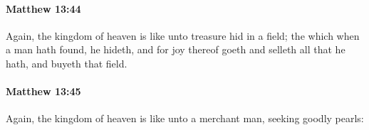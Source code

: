 		\paragraph{Matthew 13:44} %
			\label{MATTHEW-13-44}

			Again, the kingdom of heaven is like unto treasure hid in a field; the which when a man hath found, he hideth, and for joy thereof goeth and selleth all that he hath, and buyeth that field.

			\begin{framed}
			\scriptsize
				\begin{compactdesc}
					\item[SBLG] 
				\end{compactdesc}
			\end{framed}

		\paragraph{Matthew 13:45} %
			\label{MATTHEW-13-45}

			Again, the kingdom of heaven is like unto a merchant man, seeking goodly pearls:

